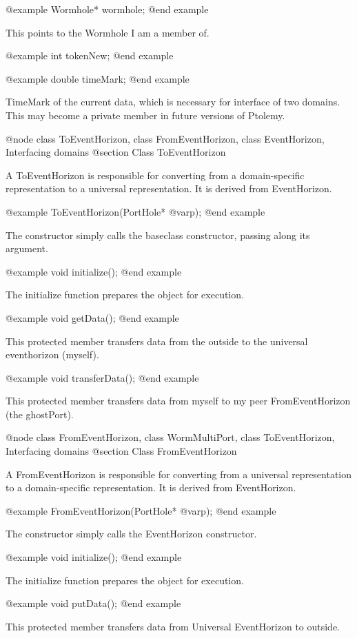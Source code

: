 @example
Wormhole* wormhole;
@end example

This points to the Wormhole I am a member of.

@example
int tokenNew;
@end example

@example
double timeMark;
@end example

TimeMark of the current data, which is necessary for interface
of two domains.  This may become a private member in future versions
of Ptolemy.

@node class ToEventHorizon, class FromEventHorizon, class EventHorizon, Interfacing domains
@section Class ToEventHorizon

A ToEventHorizon is responsible for converting from a domain-specific
representation to a universal representation.  It is derived from
EventHorizon.

@example
ToEventHorizon(PortHole* @var{p});
@end example

The constructor simply calls the baseclass constructor, passing along
its argument.

@example
void initialize();
@end example

The initialize function prepares the object for execution.

@example
void getData();
@end example

This protected member transfers data from the outside to the universal
eventhorizon (myself).

@example
void transferData();
@end example

This protected member transfers data from myself to my peer
FromEventHorizon (the ghostPort).

@node class FromEventHorizon, class WormMultiPort, class ToEventHorizon, Interfacing domains
@section Class FromEventHorizon

A FromEventHorizon is responsible for converting from a universal
representation to a domain-specific representation.  It is derived from
EventHorizon.

@example
FromEventHorizon(PortHole* @var{p});
@end example

The constructor simply calls the EventHorizon constructor.

@example
void initialize();
@end example

The initialize function prepares the object for execution.

@example
void putData();
@end example

This protected member transfers data from Universal EventHorizon to outside.

